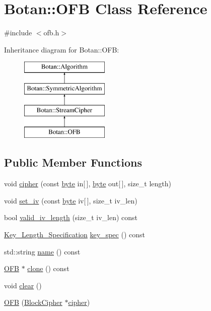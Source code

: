 \hypertarget{classBotan_1_1OFB}{\section{Botan\-:\-:O\-F\-B Class Reference}
\label{classBotan_1_1OFB}
}


{\ttfamily \#include $<$ofb.\-h$>$}

Inheritance diagram for Botan\-:\-:O\-F\-B\-:\begin{figure}[H]
\begin{center}
\leavevmode
\includegraphics[height=4.000000cm]{classBotan_1_1OFB}
\end{center}
\end{figure}
\subsection*{Public Member Functions}
\begin{DoxyCompactItemize}
\item 
void \hyperlink{classBotan_1_1OFB_a95a63dc2f9a1adff1eaddb4531a0efe0}{cipher} (const \hyperlink{namespaceBotan_a7d793989d801281df48c6b19616b8b84}{byte} in\mbox{[}$\,$\mbox{]}, \hyperlink{namespaceBotan_a7d793989d801281df48c6b19616b8b84}{byte} out\mbox{[}$\,$\mbox{]}, size\-\_\-t length)
\item 
void \hyperlink{classBotan_1_1OFB_a5a834705404862e01e86bf83b2d26eeb}{set\-\_\-iv} (const \hyperlink{namespaceBotan_a7d793989d801281df48c6b19616b8b84}{byte} iv\mbox{[}$\,$\mbox{]}, size\-\_\-t iv\-\_\-len)
\item 
bool \hyperlink{classBotan_1_1OFB_a9fa202cf66788f827a7a745ad8d4b07e}{valid\-\_\-iv\-\_\-length} (size\-\_\-t iv\-\_\-len) const 
\item 
\hyperlink{classBotan_1_1Key__Length__Specification}{Key\-\_\-\-Length\-\_\-\-Specification} \hyperlink{classBotan_1_1OFB_ac65a30e170e337a504ea6ad376346459}{key\-\_\-spec} () const 
\item 
std\-::string \hyperlink{classBotan_1_1OFB_af901a6bc0f98c054c46f3db9c51d8e89}{name} () const 
\item 
\hyperlink{classBotan_1_1OFB}{O\-F\-B} $\ast$ \hyperlink{classBotan_1_1OFB_a4217ffb89bf22123cd9bf12a1c9e0ae2}{clone} () const 
\item 
void \hyperlink{classBotan_1_1OFB_aa4ed4d27c5ad769a3a4fa44206639c5b}{clear} ()
\item 
\hyperlink{classBotan_1_1OFB_a341c0797f67ba88dcba9c1b728230825}{O\-F\-B} (\hyperlink{classBotan_1_1BlockCipher}{Block\-Cipher} $\ast$\hyperlink{classBotan_1_1OFB_a95a63dc2f9a1adff1eaddb4531a0efe0}{cipher})
\end{DoxyCompactItemize}


